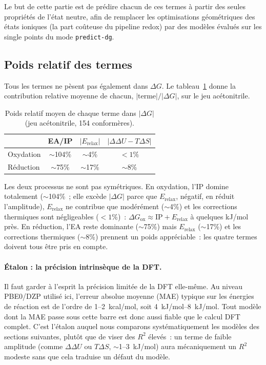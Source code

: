 Le but de cette partie est de prédire chacun de ces termes à partir des seules propriétés de l'état neutre, afin de remplacer les optimisations géométriques des états ioniques (la part coûteuse du pipeline redox) par des modèles évalués sur les single points du mode \texttt{predict-dg}.

\subsection{Poids relatif des termes}
\label{sec:poids_relatifs}

Tous les termes ne pèsent pas également dans $\Delta G$. Le tableau~\ref{tab:poids_relatifs} donne la contribution relative moyenne de chacun, $|\text{terme}|/|\Delta G|$, sur le jeu acétonitrile.

\begin{table}[H]
\centering
\caption{Poids relatif moyen de chaque terme dans $|\Delta G|$ (jeu acétonitrile, 154 conformères).}
\label{tab:poids_relatifs}
\footnotesize
\begin{tabular}{l c c c}
\toprule
 & \textbf{EA/IP} & \textbf{$|E_{\text{relax}}|$} & \textbf{$|\Delta\Delta U - T\Delta S|$} \\
\midrule
Oxydation & $\sim$104\% & $\sim$4\% & $< 1\%$ \\
Réduction & $\sim$75\%  & $\sim$17\% & $\sim$8\% \\
\bottomrule
\end{tabular}
\end{table}

Les deux processus ne sont pas symétriques. En oxydation, l'IP domine totalement ($\sim$104\%~; elle excède $|\Delta G|$ parce que $E_{\text{relax}}$, négatif, en réduit l'amplitude), $E_{\text{relax}}$ ne contribue que modérément ($\sim$4\%) et les corrections thermiques sont négligeables ($< 1\%$)~: $\Delta G_{\text{ox}} \approx \text{IP} + E_{\text{relax}}$ à quelques kJ/mol près. En réduction, l'EA reste dominante ($\sim$75\%) mais $E_{\text{relax}}$ ($\sim$17\%) et les corrections thermiques ($\sim$8\%) prennent un poids appréciable~: les quatre termes doivent tous être pris en compte.

\paragraph{Étalon : la précision intrinsèque de la DFT.}
Il faut garder à l'esprit la précision limitée de la DFT elle-même. Au niveau PBE0/DZP utilisé ici, l'erreur absolue moyenne (MAE) typique sur les énergies de réaction est de l'ordre de 1--2~kcal/mol, soit \SIrange{4}{8}{kJ/mol}\cite{goerigk2017}. Tout modèle dont la MAE passe sous cette barre est donc aussi fiable que le calcul DFT complet. C'est l'étalon auquel nous comparons systématiquement les modèles des sections suivantes, plutôt que de viser des $R^2$ élevés~: un terme de faible amplitude (comme $\Delta\Delta U$ ou $T\Delta S$, $\sim$1--3~kJ/mol) aura mécaniquement un $R^2$ modeste sans que cela traduise un défaut du modèle.

